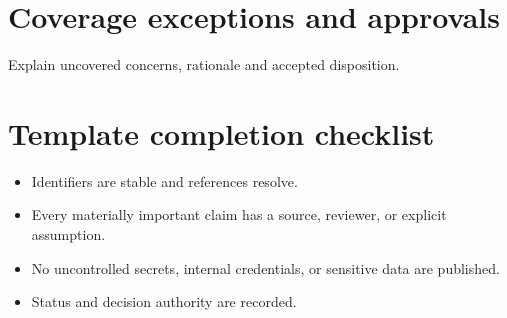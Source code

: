 \documentclass[10pt,letterpaper]{article}
\begin{document}
\section{Coverage exceptions and approvals}
Explain uncovered concerns, rationale and accepted disposition.

\section{Template completion checklist}
\begin{itemize}
\item Identifiers are stable and references resolve.
\item Every materially important claim has a source, reviewer, or explicit assumption.
\item No uncontrolled secrets, internal credentials, or sensitive data are published.
\item Status and decision authority are recorded.
\end{itemize}
\end{document}
